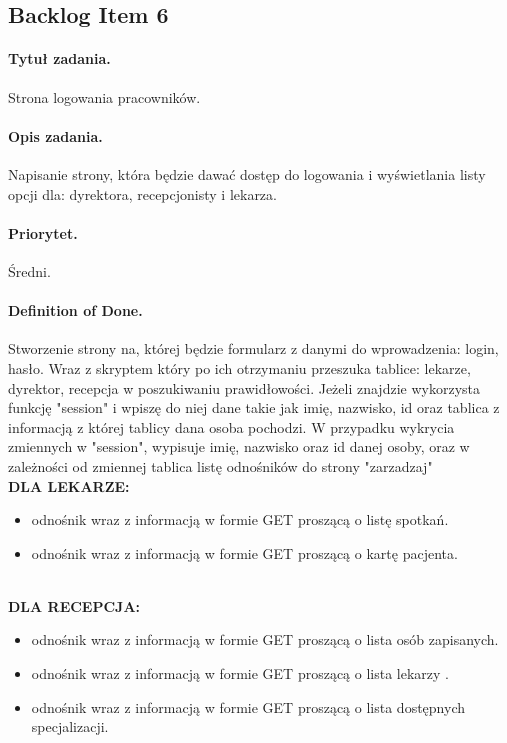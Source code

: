 \documentclass[a4paper]{article} \usepackage{polski} \usepackage[cp1250]{inputenc} \usepackage{url}
\begin{document}
\subsection{Backlog Item 6}\paragraph{Tytuł zadania.} Strona logowania pracowników. \paragraph{Opis zadania.} Napisanie strony, która będzie dawać dostęp do logowania i wyświetlania listy opcji dla: dyrektora, recepcjonisty i lekarza. \paragraph{Priorytet.} Średni. \paragraph{Definition of Done.} Stworzenie strony na, której będzie formularz z danymi do wprowadzenia: login, hasło. Wraz z skryptem który po ich otrzymaniu przeszuka tablice: lekarze, dyrektor, recepcja w poszukiwaniu prawidłowości. Jeżeli znajdzie wykorzysta funkcję "session" i wpiszę do niej dane takie jak imię, nazwisko, id oraz tablica z informacją z której tablicy dana osoba pochodzi. W przypadku wykrycia zmiennych w "session", wypisuje imię, nazwisko oraz id danej osoby, oraz w zależności od zmiennej tablica listę odnośników do strony "zarzadzaj" \\

 \textbf{DLA LEKARZE:}
 \begin {itemize}
\item odnośnik wraz z informacją w formie GET proszącą o listę spotkań.
\item odnośnik wraz z informacją w formie GET proszącą o kartę pacjenta.
\end {itemize} \\

\textbf{DLA RECEPCJA:}
\begin {itemize}
\item odnośnik wraz z informacją w formie GET proszącą o lista osób zapisanych. 
\item odnośnik wraz z informacją w formie GET proszącą o lista lekarzy .
\item odnośnik wraz z informacją w formie GET proszącą o lista dostępnych specjalizacji. 
\end{itemize}
\end{document}
